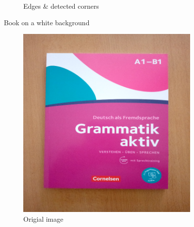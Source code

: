\documentclass{scrartcl}
\begin{document}
\begin{figure}[!htbp]
\begin{subfigure}[b]{0.3\textwidth}
      \caption{Edges \& detected corners}
    \end{subfigure}
    \caption{Book on a white background}
    \label{figure:document-on-white-background}
  \end{figure}

  \begin{figure}[!htbp]
    \centering
    \begin{subfigure}[b]{0.3\textwidth}
      \centering
      \includegraphics[width=\textwidth]{pictures/results/reference4/original.png}
      \caption{Origial image}
    \end{subfigure}
    \begin{subfigure}[b]{0.3\textwidth}
      \centering

\end{subfigure}
\end{figure}
\end{document}
